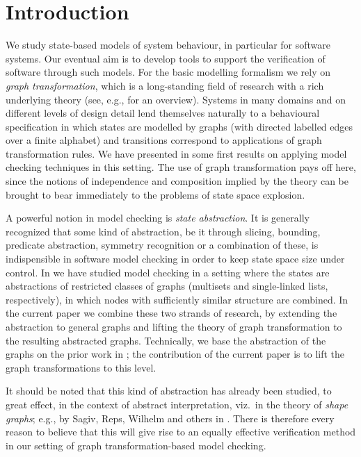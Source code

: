 \section{Introduction}

We study state-based models of system behaviour, in particular for software
systems. Our eventual aim is to develop tools to support the verification of
software through such models. For the basic modelling formalism we rely on
\emph{graph transformation}, which is a long-standing field of research with a
rich underlying theory (see, e.g., \cite{Handbook-GG-I} for an overview).
Systems in many domains and on different levels of design detail lend
themselves naturally to a behavioural specification in which states are
modelled by graphs (with directed labelled edges over a finite alphabet) and
transitions correspond to applications of graph transformation rules. We have
presented in \cite{RenSchVar04} some first results on applying model checking
techniques in this setting. The use of graph transformation pays off here,
since the notions of independence and composition implied by the theory can be
brought to bear immediately to the problems of state space explosion.

A powerful notion in model checking is \emph{state abstraction}. It is
generally recognized that some kind of abstraction, be it through slicing,
bounding, predicate abstraction, symmetry recognition or a combination of
these, is indispensible in software model checking in order to keep state space
size under control. In \cite{DisRenKat02,DisKatRen04} we have studied model
checking in a setting where the states are abstractions of restricted classes
of graphs (multisets and single-linked lists, respectively), in which nodes
with sufficiently similar structure are combined. In the current paper we
combine these two strands of research, by extending the abstraction
to general graphs and lifting the theory of graph transformation to the resulting
abstracted graphs. Technically, we base the abstraction of the graphs
on the prior work in \cite{Rens04-esop}; the contribution of the current
paper is to lift the graph transformations to this level.

It should be noted that this kind of abstraction has already been studied, to
great effect, in the context of abstract interpretation, viz.\ in the theory of
\emph{shape graphs}; e.g., by Sagiv, Reps, Wilhelm and others in
\cite{SagRepWil98,SagRepWil02,Jeannet+2004,Rinetzky+2005}. There is therefore
every reason to believe that this will give rise to an equally effective
verification method in our setting of graph transformation-based model
checking.

